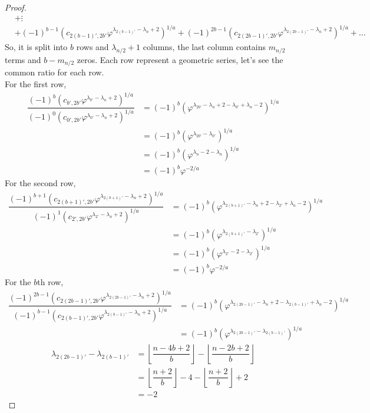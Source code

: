 \documentclass[preprint,12pt]{elsarticle}
\begin{document}
\begin{proof}
\begin{align*}
		&+\vdots\\
		&+(-1)^{b-1}(c_{2(b-1)',2b'}\varphi^{\lambda_{2(b-1)'}-\lambda_{n}+2})^{1/a}+(-1)^{2b-1}(c_{2(2b-1)',2b'}\varphi^{\lambda_{2(2b-1)'}-\lambda_{n}+2})^{1/a}+\ldots
	\end{align*}  
	\clearpage
	So, it is split into $b$ rows and $\lambda_{n/2} + 1$ columns, the last column contains $m_{n/2}$ terms and $b - m_{n/2}$ zeros. Each row represent a geometric series, let's see the common ratio for each row.\\
	For the first row,
	\begin{align*}
		\dfrac{(-1)^{b}(c_{b',2b'}\varphi^{\lambda_{b'}-\lambda_{n}+2})^{1/a}}{(-1)^0(c_{0',2b'}\varphi^{\lambda_{0'}-\lambda_{n}+2})^{1/a}} &= (-1)^b\left(\varphi^{\lambda_{2b'}-\lambda_{n}+2-\lambda_{0'}+\lambda_{n}-2}\right)^{1/a}\\
		&= (-1)^b\left(\varphi^{\lambda_{2b'}-\lambda_{0'}}\right)^{1/a}\\
		&= (-1)^b\left(\varphi^{\lambda_{n}-2-\lambda_{n}}\right)^{1/a}\\
		&=(-1)^b \varphi^{-2/a}
	\end{align*}
	For the second row,
	\begin{align*}
		\dfrac{(-1)^{b+1}(c_{2(b+1)',2b'}\varphi^{\lambda_{2(b+1)'}-\lambda_{n}+2})^{1/a}}{(-1)^{1}(c_{2',2b'}\varphi^{\lambda_{2'}-\lambda_{n}+2})^{1/a}} &= (-1)^b\left(\varphi^{\lambda_{2(b+1)'}-\lambda_{n}+2-\lambda_{2'}+\lambda_{n}-2}\right)^{1/a}\\
		&= (-1)^b\left(\varphi^{\lambda_{2(b+1)'}-\lambda_{2'}}\right)^{1/a}\\
		&= (-1)^b\left(\varphi^{\lambda_{2'}-2-\lambda_{2'}}\right)^{1/a}\\
		&=(-1)^b \varphi^{-2/a}
	\end{align*}
	For the $b$th row,
	\begin{align*}
	\dfrac{(-1)^{2b-1}(c_{2(2b-1)',2b'}\varphi^{\lambda_{2(2b-1)'}-\lambda_{n}+2})^{1/a}}{(-1)^{b-1}(c_{2(b-1)',2b'}\varphi^{\lambda_{2(b-1)'}-\lambda_{n}+2})^{1/a}} &= (-1)^b\left(\varphi^{\lambda_{2(2b-1)'}-\lambda_{n}+2-\lambda_{2(b-1)'}+\lambda_{n}-2}\right)^{1/a}\\
	&= (-1)^b\left(\varphi^{\lambda_{2(2b-1)'}-\lambda_{2(b-1)'}}\right)^{1/a}
	\end{align*}
	\begin{align*}
		\lambda_{2(2b-1)'}-\lambda_{2(b-1)'} &= \left\lfloor\dfrac{n-4b+2}{b}\right\rfloor-\left\lfloor\dfrac{n-2b+2}{b}\right\rfloor\\&=\left\lfloor\dfrac{n+2}{b}\right\rfloor-4-\left\lfloor\dfrac{n+2}{b}\right\rfloor+2\\ &= -2

\end{align*}
\end{proof}
\end{document}
